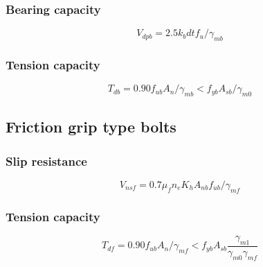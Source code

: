 \documentclass[11.5pt,a4paper,oneside]{report}
\begin{document}
\begin{Form}
\subsubsection{Bearing capacity}
\begin{equation}
V_{dpb} = 2.5 k_b d t f_u / \gamma_{mb}
\end{equation}
\subsubsection{Tension capacity}
\begin{equation}
T_{db} = 0.90 f_{ub} A_n / \gamma_{mb} < f_{yb} A_{sb} / \gamma_{m0}
\end{equation}
\subsection{Friction grip type bolts}
\subsubsection{Slip resistance}
\begin{equation}
V_{nsf} = 0.7 \mu_f n_e  K_h A_{nb} f_{ub} / \gamma_{mf}
\end{equation}
\subsubsection{Tension capacity}
\begin{equation}
T_{df} = 0.90 f_{ub} A_n / \gamma_{mf} < f_{yb} A_{sb}  \frac{\gamma_{m1}}{\gamma_{m0} \gamma_{mf}}
\end{equation}

\end{Form}
\end{document}

